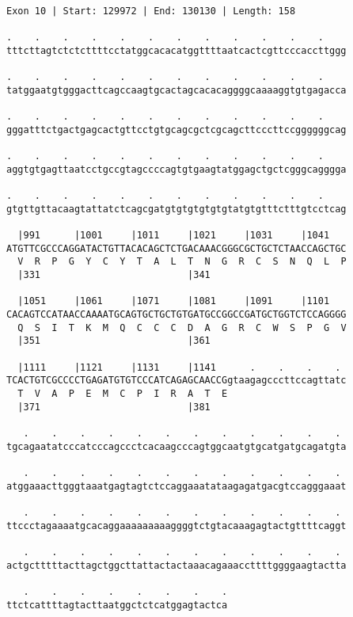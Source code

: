 \documentclass{article}
\begin{document}
\begin{Verbatim}[fontfamily=courier]
Exon 10 | Start: 129972 | End: 130130 | Length: 158

.    .    .    .    .    .    .    .    .    .    .    .    
tttcttagtctctcttttcctatggcacacatggttttaatcactcgttcccaccttggg

.    .    .    .    .    .    .    .    .    .    .    .    
tatggaatgtgggacttcagccaagtgcactagcacacaggggcaaaaggtgtgagacca

.    .    .    .    .    .    .    .    .    .    .    .    
gggatttctgactgagcactgttcctgtgcagcgctcgcagcttcccttccggggggcag

.    .    .    .    .    .    .    .    .    .    .    .    
aggtgtgagttaatcctgccgtagccccagtgtgaagtatggagctgctcgggcagggga

.    .    .    .    .    .    .    .    .    .    .    .    
gtgttgttacaagtattatctcagcgatgtgtgtgtgtgtatgtgtttctttgtcctcag

  |991      |1001     |1011     |1021     |1031     |1041   
ATGTTCGCCCAGGATACTGTTACACAGCTCTGACAAACGGGCGCTGCTCTAACCAGCTGC
  V  R  P  G  Y  C  Y  T  A  L  T  N  G  R  C  S  N  Q  L  P
  |331                          |341                        

  |1051     |1061     |1071     |1081     |1091     |1101   
CACAGTCCATAACCAAAATGCAGTGCTGCTGTGATGCCGGCCGATGCTGGTCTCCAGGGG
  Q  S  I  T  K  M  Q  C  C  C  D  A  G  R  C  W  S  P  G  V
  |351                          |361                        

  |1111     |1121     |1131     |1141      .    .    .    . 
TCACTGTCGCCCCTGAGATGTGTCCCATCAGAGCAACCGgtaagagcccttccagttatc
  T  V  A  P  E  M  C  P  I  R  A  T  E                     
  |371                          |381                        

   .    .    .    .    .    .    .    .    .    .    .    . 
tgcagaatatcccatcccagccctcacaagcccagtggcaatgtgcatgatgcagatgta

   .    .    .    .    .    .    .    .    .    .    .    . 
atggaaacttgggtaaatgagtagtctccaggaaatataagagatgacgtccagggaaat

   .    .    .    .    .    .    .    .    .    .    .    . 
ttccctagaaaatgcacaggaaaaaaaaaggggtctgtacaaagagtactgttttcaggt

   .    .    .    .    .    .    .    .    .    .    .    . 
actgctttttacttagctggcttattactactaaacagaaaccttttggggaagtactta

   .    .    .    .    .    .    .    .
ttctcattttagtacttaatggctctcatggagtactca
\end{Verbatim}
\end{document}
